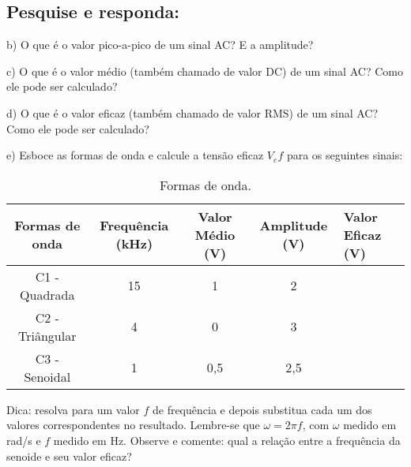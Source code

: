 \subsection{Pesquise e responda:}

\noindent b) O que é o valor pico-a-pico de um sinal AC? E a amplitude?

\noindent c) O que é o valor médio (também chamado de valor DC) de um sinal AC? Como ele pode ser calculado?

\noindent d) O que é o valor eficaz (também chamado de valor RMS) de um sinal AC? Como ele pode ser calculado?

\noindent e) Esboce as formas de onda e calcule a tensão eficaz $V_ef$ para os seguintes sinais:

\begin{table}[H]
    \centering
    \begin{tabular}{|c|c|c|c|l|}
    \hline
    Formas de onda  & Frequência (kHz) & Valor Médio (V) & Amplitude (V) & Valor Eficaz (V) \\
    \hline
    C1 - Quadrada   & 15               & 1               & 2             &                                      \\
    \hline
    C2 - Triângular & 4                & 0               & 3             &                                      \\
    \hline
    C3 - Senoidal   & 1                & 0,5             & 2,5           &     \\ \hline                                
    \end{tabular}
    \caption{Formas de onda.}
    \label{tab:form_wave}
    \end{table}

Dica: resolva para um valor $f$ de frequência e depois substitua cada um dos valores correspondentes no resultado. Lembre-se que $\omega = 2\pi f$, com $\omega$ medido em rad/s e $f$ medido em Hz. Observe e comente: qual a relação entre a frequência da senoide e seu valor eficaz?
